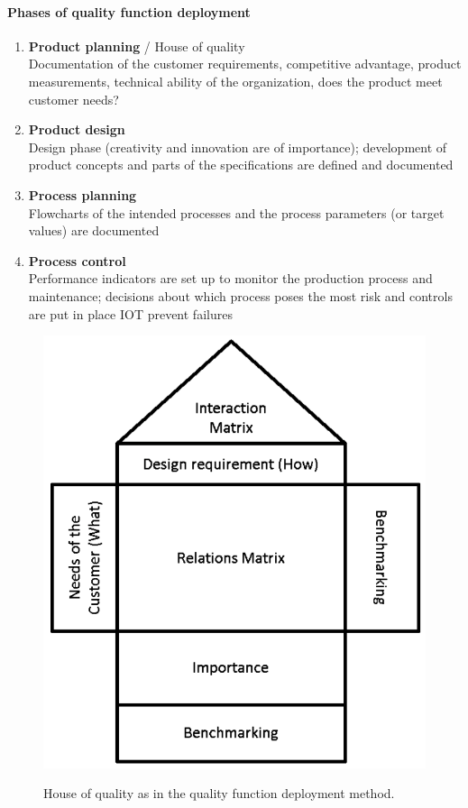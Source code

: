 \documentclass[a4paper, landscape, 6pt, fleqn]{scrartcl}
\renewcommand{\emph}[1]{\textbf{#1}}
\begin{document}
\begin{multicols*}{4}
\paragraph{Phases of quality function deployment}

\begin{enumerate}
\item \emph{Product planning} / House of quality \\
Documentation of the customer requirements, competitive advantage, product measurements, technical ability of the organization, does the product meet customer needs?
\item \emph{Product design} \\
Design phase (creativity and innovation are of importance); development of product concepts and parts of the specifications are defined and documented
\item \emph{Process planning} \\
Flowcharts of the intended processes and the process parameters (or target values) are documented
\item \emph{Process control} \\
Performance indicators are set up to monitor the production process and maintenance; decisions about which process poses the most risk and controls are put in place IOT prevent failures
\end{enumerate}

\begin{figure}[H]
\centering
\includegraphics[width=0.7 \linewidth]{HouseOfQuality}
\label{fig:HouseOfQuality}
\caption{House of quality as in the quality function deployment method.}
\end{figure}


\end{multicols*}
\end{document}
